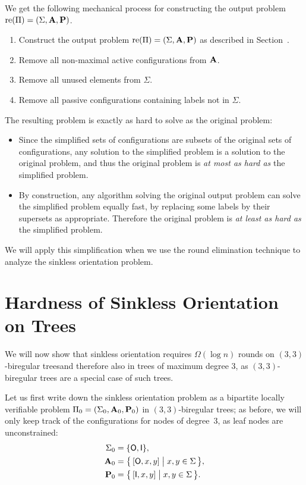 We get the following mechanical process for constructing the output problem $\operatorname{re}(\Pi) = (\Sigma, \mathbf{A}, \mathbf{P})$.
\begin{enumerate}[noitemsep]
	\item Construct the output problem $\operatorname{re}(\Pi) = (\Sigma, \mathbf{A}, \mathbf{P})$ as described in Section~.
	\item Remove all non-maximal active configurations from $\mathbf{A}$.
	\item Remove all unused elements from $\Sigma$.
	\item Remove all passive configurations containing labels not in $\Sigma$.
\end{enumerate}

The resulting problem is exactly as hard to solve as the original problem:
\begin{itemize}
	\item Since the simplified sets of configurations are subsets of the original sets of configurations, any solution to the simplified problem is a solution to the original problem, and thus the original problem is  \emph{at most as hard as} the simplified problem.
	\item By construction, any algorithm solving the original output problem can solve the simplified problem equally fast, by replacing some labels by their supersets as appropriate. Therefore the original problem is \emph{at least as hard as} the simplified problem. 
\end{itemize}
We will apply this simplification when we use the round elimination technique to analyze the sinkless orientation problem.

\section{Hardness of Sinkless Orientation on Trees}\label{sec:so-hard-trees}

We will now show that sinkless orientation requires $\Omega(\log n)$ rounds on $(3,3)$-biregular trees\mydash and therefore also in trees of maximum degree $3$, as $(3,3)$-biregular trees are a special case of such trees.

Let us first write down the sinkless orientation problem as a bipartite locally verifiable problem $\Pi_0 = (\Sigma_0, \mathbf{A}_0, \mathbf{P}_0)$ in $(3,3)$-biregular trees; as before, we will only keep track of the configurations for nodes of degree~$3$, as leaf nodes are unconstrained:
\begin{align*}
\Sigma_0 &= \{ \mathsf{O}, \mathsf{I} \}, \\
\mathbf{A}_0 &= \bigl\{ \, [\mathsf{O}, x, y] \bigm| x, y \in \Sigma \, \bigr\}, \\
\mathbf{P}_0 &= \bigl\{ \, [\mathsf{I}, x, y] \bigm| x, y \in \Sigma \, \bigr\}.
\end{align*}

